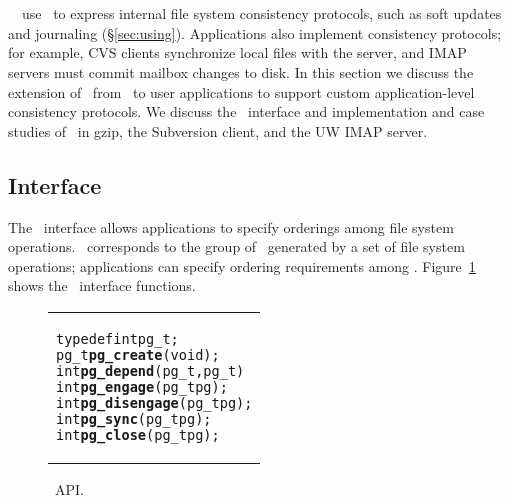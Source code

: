 \section{\Opgroups}
\label{sec:opgroup}

\newcommand{\opgroupCreate}{\texttt{pg\_create()}}
\newcommand{\opgroupAddDepend}{\texttt{pg\_depend()}}
\newcommand{\opgroupEngage}{\texttt{pg\_engage()}}
\newcommand{\opgroupDisengage}{\texttt{pg\_disengage()}}
\newcommand{\opgroupRelease}{\texttt{pg\_release()}}
\newcommand{\opgroupSync}{\texttt{pg\_sync()}}
\newcommand{\opgroupAbandon}{\texttt{pg\_close()}}

\Kudos\ \modules\ use \chdescs\ to express internal file system
consistency protocols, such as soft updates and journaling
(\S\ref{sec:using}).
%
Applications also implement consistency protocols; for example, CVS
clients synchronize local files with the server, and IMAP servers
must commit mailbox changes to disk. In this section we discuss the
extension of \chdescs\ from \Kudos\ to user applications to support
custom application-level consistency protocols. We discuss the
\opgroup\ interface and implementation and case studies of \opgroups\
in gzip, the Subversion client, and the UW IMAP server.

\subsection{Interface}
\label{sec:opgroup:interface}

The \opgroup\ interface allows applications to specify orderings among
file system operations.
%
\Anopgroup\ corresponds to the group of \chdescs\ generated by a set
of file system operations; applications can specify ordering
requirements among \opgroups.
%
Figure~\ref{fig:opgroup-interface} shows the \opgroup\ interface
functions.

\begin{figure}[htb]
\vskip-14pt
\begin{tabular}{@{\hskip0.22in}p{2in}@{}}
\begin{scriptsize}
\begin{alltt}
typedef int pg_t;
pg_t \textbf{pg_create}(void);
int  \textbf{pg_depend}(pg_t \after, pg_t \before)
int  \textbf{pg_engage}(pg_t pg);
int  \textbf{pg_disengage}(pg_t pg);
int  \textbf{pg_sync}(pg_t pg);
int  \textbf{pg_close}(pg_t pg);
\end{alltt}
\end{scriptsize}
\end{tabular}
\vspace{-10pt}
\caption{\label{fig:opgroup-interface} \Opgroup\ API.}
\end{figure}

